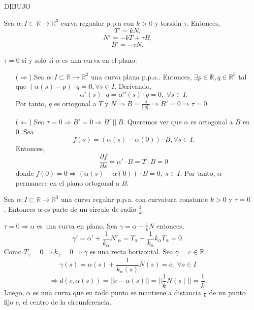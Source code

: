 DIBUJO

\begin{defn}
  Sea $\alpha  : I \subset \mathbb{R} \to \mathbb{R}^{3}$ curva regualar p.p.a con $k>0$ y torsión $\tau$. Entonces, 
  \[ 
    T' = kN, 
  \] 
  \[ 
    N' = -kT + \tau B,
  \] 
  \[ 
    B' = -\tau N,
  \] 
\end{defn}

\begin{prop}
  $\tau = 0$ si y solo si $\alpha$ es una curva en el plano.
\end{prop}

\begin{dem}
  \begin{enumerate}[label=(\roman*)]
    \item [($\Rightarrow$)] Sea $\alpha  : I \subset \mathbb{R} \to \mathbb{R}^{3}$ una curva plana p.p.a.. Entonces, $\exists p \in \mathbb{R}, q \in \mathbb{R}^{3}$ tal que $(\alpha(s) - p) \cdot q = 0, \forall s \in I$. Derivando,
  \[ 
    \alpha'(s) \cdot q = \alpha''(s) \cdot q = 0, \; \forall s \in I.
  \] 
  Por tanto, $q$ es ortogonal a $T$ y $N \Rightarrow B = \frac{q}{||q||} \Rightarrow B' = 0 \Rightarrow \tau = 0$.
    \item [($\Leftarrow$)] Sea $\tau = 0 \Rightarrow B' = 0 \Rightarrow B' \ || \ B$. Queremos ver que $\alpha$ es ortogonal a $B$ en $0$. Sea 
      \[ 
        f(s) = (\alpha(s) - \alpha(0)) \cdot B, \forall s \in I .
      \] 
      Entonces,
      \[
        \frac{\partial{f}}{\partial{s}} = \alpha' \cdot B = T \cdot B = 0
      \]
      donde $f(0) = 0 \Rightarrow (\alpha(s) - \alpha(0)) \cdot B = 0, \; s \in I$. Por tanto, $\alpha$ permanece en el plano ortogonal a $B$.
  \end{enumerate}
\end{dem}

\begin{prop}
  Sea $\alpha  : I \subset \mathbb{R} \to \mathbb{R}^{3}$ una curva regular p.p.a. con curvatura constante $k>0$ y $\tau = 0$. Entonces $\alpha$ es parte de un circulo de radio $\frac{1}{k}$.
\end{prop}

\begin{dem}
  $\tau = 0 \Rightarrow \alpha$ es una curva en plano. Sea $\gamma = \alpha + \frac{1}{k}N$ entonces,
  \[ 
    \gamma' = \alpha' + \frac{1}{k_{\alpha}}N'_{\alpha} = T_{\alpha} - \frac{1}{k_{\alpha}}k_{\alpha}T_{\alpha} = 0.
  \] 
  Como $T_{\gamma} = 0 \Rightarrow k_{\gamma} =0 \Rightarrow \gamma$ es una recta horizontal. Sea $\gamma = c \in \mathbb{R}$
  \[ 
    \gamma(s) = \alpha(s) + \frac{1}{k_{\alpha}(s)}N(s) = c, \; \forall s  \in I
  \] 
  \[ 
    \Rightarrow d(c, \alpha(s)) = ||c - \alpha(s)|| = ||\frac{1}{k}N(s)|| = \frac{1}{k}.
  \] 
  Luego, $\alpha$ es una curva que en todo punto se mantiene a distancia $\frac{1}{k}$ de un punto fijo $c$, el centro de la circunferencia.
\end{dem}

